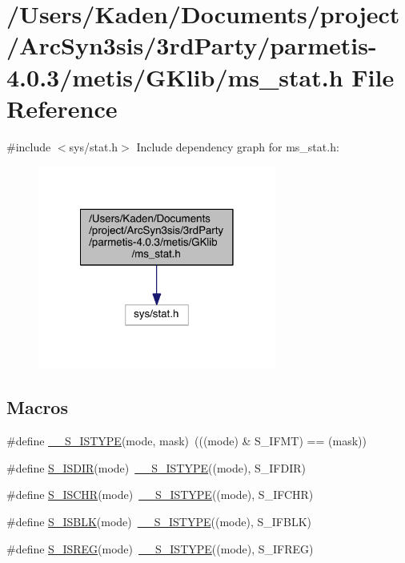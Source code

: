 \hypertarget{a00116}{}\section{/\+Users/\+Kaden/\+Documents/project/\+Arc\+Syn3sis/3rd\+Party/parmetis-\/4.0.3/metis/\+G\+Klib/ms\+\_\+stat.h File Reference}
\label{a00116}
{\ttfamily \#include $<$sys/stat.\+h$>$}\newline
Include dependency graph for ms\+\_\+stat.\+h\+:\nopagebreak
\begin{figure}[H]
\begin{center}
\leavevmode
\includegraphics[width=222pt]{a00117}
\end{center}
\end{figure}
\subsection*{Macros}
\begin{DoxyCompactItemize}
\item 
\#define \hyperlink{a00116_ad6cc2c92a37f1b56b76252e59a354d95}{\+\_\+\+\_\+\+S\+\_\+\+I\+S\+T\+Y\+PE}(mode,  mask)~(((mode) \& S\+\_\+\+I\+F\+MT) == (mask))
\item 
\#define \hyperlink{a00116_a3746cdc5aac871e6f6504fbcbd29ef1d}{S\+\_\+\+I\+S\+D\+IR}(mode)~\hyperlink{a00116_ad6cc2c92a37f1b56b76252e59a354d95}{\+\_\+\+\_\+\+S\+\_\+\+I\+S\+T\+Y\+PE}((mode), S\+\_\+\+I\+F\+D\+IR)
\item 
\#define \hyperlink{a00116_aae33be85d242a1317f972cf2b189f03d}{S\+\_\+\+I\+S\+C\+HR}(mode)~\hyperlink{a00116_ad6cc2c92a37f1b56b76252e59a354d95}{\+\_\+\+\_\+\+S\+\_\+\+I\+S\+T\+Y\+PE}((mode), S\+\_\+\+I\+F\+C\+HR)
\item 
\#define \hyperlink{a00116_a8b86a24d84c3cfce39cc832a017656ba}{S\+\_\+\+I\+S\+B\+LK}(mode)~\hyperlink{a00116_ad6cc2c92a37f1b56b76252e59a354d95}{\+\_\+\+\_\+\+S\+\_\+\+I\+S\+T\+Y\+PE}((mode), S\+\_\+\+I\+F\+B\+LK)
\item 
\#define \hyperlink{a00116_aad0f32c2c182238f2ff71c83e6ab65a0}{S\+\_\+\+I\+S\+R\+EG}(mode)~\hyperlink{a00116_ad6cc2c92a37f1b56b76252e59a354d95}{\+\_\+\+\_\+\+S\+\_\+\+I\+S\+T\+Y\+PE}((mode), S\+\_\+\+I\+F\+R\+EG)
\end{DoxyCompactItemize}


